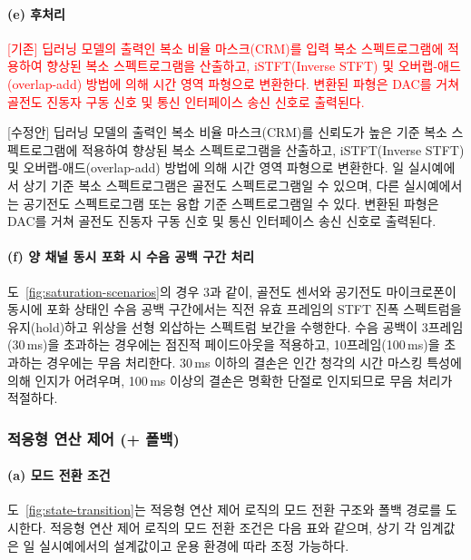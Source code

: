 \documentclass{article}
\newcommand{\reviewold}[1]{{\par\noindent\textcolor{red}{[기존] #1}}}
\newcommand{\reviewnew}[1]{{\par\noindent\textcolor{customblue}{[수정안] #1}}}
\newcommand{\reviewpair}[2]{\reviewold{#1}\reviewnew{#2}\par}
\begin{document}
\paragraph{(e) 후처리}

\reviewpair{딥러닝 모델의 출력인 복소 비율 마스크(CRM)를 입력 복소 스펙트로그램에 적용하여 향상된 복소 스펙트로그램을 산출하고, iSTFT(Inverse STFT) 및 오버랩-애드(overlap-add) 방법에 의해 시간 영역 파형으로 변환한다. 변환된 파형은 DAC를 거쳐 골전도 진동자 구동 신호 및 통신 인터페이스 송신 신호로 출력된다.}{딥러닝 모델의 출력인 복소 비율 마스크(CRM)를 신뢰도가 높은 기준 복소 스펙트로그램에 적용하여 향상된 복소 스펙트로그램을 산출하고, iSTFT(Inverse STFT) 및 오버랩-애드(overlap-add) 방법에 의해 시간 영역 파형으로 변환한다. 일 실시예에서 상기 기준 복소 스펙트로그램은 골전도 스펙트로그램일 수 있으며, 다른 실시예에서는 공기전도 스펙트로그램 또는 융합 기준 스펙트로그램일 수 있다. 변환된 파형은 DAC를 거쳐 골전도 진동자 구동 신호 및 통신 인터페이스 송신 신호로 출력된다.}

\paragraph{(f) 양 채널 동시 포화 시 수음 공백 구간 처리}

도~\ref{fig:saturation-scenarios}의 경우 3과 같이, 골전도 센서와 공기전도 마이크로폰이 동시에 포화 상태인 수음 공백 구간에서는 직전 유효 프레임의 STFT 진폭 스펙트럼을 유지(hold)하고 위상을 선형 외삽하는 스펙트럼 보간을 수행한다. 수음 공백이 3프레임(30\,ms)을 초과하는 경우에는 점진적 페이드아웃을 적용하고, 10프레임(100\,ms)을 초과하는 경우에는 무음 처리한다. 30\,ms 이하의 결손은 인간 청각의 시간 마스킹 특성에 의해 인지가 어려우며, 100\,ms 이상의 결손은 명확한 단절로 인지되므로 무음 처리가 적절하다.

\subsubsection{적응형 연산 제어 (+ 폴백)}

\paragraph{(a) 모드 전환 조건}

도~\ref{fig:state-transition}는 적응형 연산 제어 로직의 모드 전환 구조와 폴백 경로를 도시한다. 적응형 연산 제어 로직의 모드 전환 조건은 다음 표와 같으며, 상기 각 임계값은 일 실시예에서의 설계값이고 운용 환경에 따라 조정 가능하다.
\end{document}
